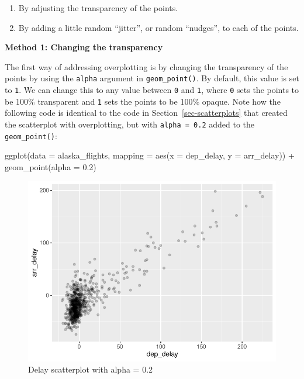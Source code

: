 \documentclass[
  letterpaper,
  DIV=11,
  numbers=noendperiod]{scrreprt}
\newenvironment{Shaded}{\begin{snugshade}}{\end{snugshade}}
\newcommand{\AttributeTok}[1]{\textcolor[rgb]{0.40,0.45,0.13}{#1}}
\newcommand{\FloatTok}[1]{\textcolor[rgb]{0.68,0.00,0.00}{#1}}
\newcommand{\FunctionTok}[1]{\textcolor[rgb]{0.28,0.35,0.67}{#1}}
\newcommand{\NormalTok}[1]{\textcolor[rgb]{0.00,0.23,0.31}{#1}}
\newcommand{\SpecialCharTok}[1]{\textcolor[rgb]{0.37,0.37,0.37}{#1}}
\providecommand{\tightlist}{%
  \setlength{\itemsep}{0pt}\setlength{\parskip}{0pt}}\usepackage{longtable,booktabs,array}
\theoremstyle{definition}
\theoremstyle{remark}
\begin{document}
\begin{enumerate}
\def\labelenumi{\arabic{enumi}.}
\tightlist
\item
  By adjusting the transparency of the points.
\item
  By adding a little random ``jitter'', or random ``nudges'', to each of
  the points.
\end{enumerate}

\textbf{Method 1: Changing the transparency}

The first way of addressing overplotting is by changing the transparency
of the points by using the \texttt{alpha} argument in
\texttt{geom\_point()}. By default, this value is set to \texttt{1}. We
can change this to any value between \texttt{0} and \texttt{1}, where
\texttt{0} sets the points to be 100\% transparent and \texttt{1} sets
the points to be 100\% opaque. Note how the following code is identical
to the code in Section~\ref{sec-scatterplots} that created the
scatterplot with overplotting, but with \texttt{alpha\ =\ 0.2} added to
the \texttt{geom\_point()}:

\begin{Shaded}
\begin{Highlighting}[]
\FunctionTok{ggplot}\NormalTok{(}\AttributeTok{data =}\NormalTok{ alaska\_flights, }\AttributeTok{mapping =} \FunctionTok{aes}\NormalTok{(}\AttributeTok{x =}\NormalTok{ dep\_delay, }\AttributeTok{y =}\NormalTok{ arr\_delay)) }\SpecialCharTok{+} 
  \FunctionTok{geom\_point}\NormalTok{(}\AttributeTok{alpha =} \FloatTok{0.2}\NormalTok{)}
\end{Highlighting}
\end{Shaded}

\begin{figure}[H]

{\centering \includegraphics{02-visualization_files/figure-pdf/fig-alpha-1.pdf}

}

\caption{\label{fig-alpha}Delay scatterplot with alpha = 0.2}

\end{figure}
\end{document}
